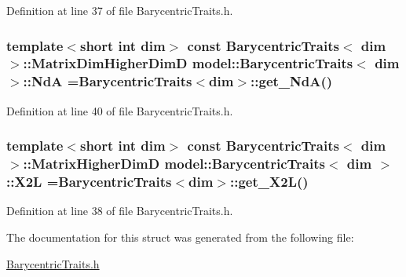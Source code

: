 Definition at line 37 of file Barycentric\+Traits.\+h.

\hypertarget{structmodel_1_1_barycentric_traits_acb15b3ea4de71974eed1dc5285b0e5c9}{}
\subsubsection[{Nd\+A}]{\setlength{\rightskip}{0pt plus 5cm}template$<$short int dim$>$ const {\bf Barycentric\+Traits}$<$ {\bf dim} $>$\+::{\bf Matrix\+Dim\+Higher\+Dim\+D} {\bf model\+::\+Barycentric\+Traits}$<$ {\bf dim} $>$\+::Nd\+A ={\bf Barycentric\+Traits}$<${\bf dim}$>$\+::get\+\_\+\+Nd\+A()\hspace{0.3cm}{\ttfamily [static]}}\label{structmodel_1_1_barycentric_traits_acb15b3ea4de71974eed1dc5285b0e5c9}


Definition at line 40 of file Barycentric\+Traits.\+h.

\hypertarget{structmodel_1_1_barycentric_traits_a9db9e597447070e334d9ed4f2c12902d}{}
\subsubsection[{X2\+L}]{\setlength{\rightskip}{0pt plus 5cm}template$<$short int dim$>$ const {\bf Barycentric\+Traits}$<$ {\bf dim} $>$\+::{\bf Matrix\+Higher\+Dim\+D} {\bf model\+::\+Barycentric\+Traits}$<$ {\bf dim} $>$\+::X2\+L ={\bf Barycentric\+Traits}$<${\bf dim}$>$\+::get\+\_\+\+X2\+L()\hspace{0.3cm}{\ttfamily [static]}}\label{structmodel_1_1_barycentric_traits_a9db9e597447070e334d9ed4f2c12902d}


Definition at line 38 of file Barycentric\+Traits.\+h.



The documentation for this struct was generated from the following file\+:\begin{DoxyCompactItemize}
\item 
\hyperlink{_barycentric_traits_8h}{Barycentric\+Traits.\+h}\end{DoxyCompactItemize}
